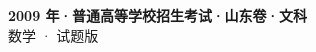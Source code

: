 \documentclass[zihao=-4, a4paper]{ctexart}
\begin{document}
\begin{center}
  {\Large\bfseries 2009 年·普通高等学校招生考试·山东卷·文科}\\[4pt]
  {\large 数学 · 试题版}
\end{center}
\medskip
{}

\end{document}
